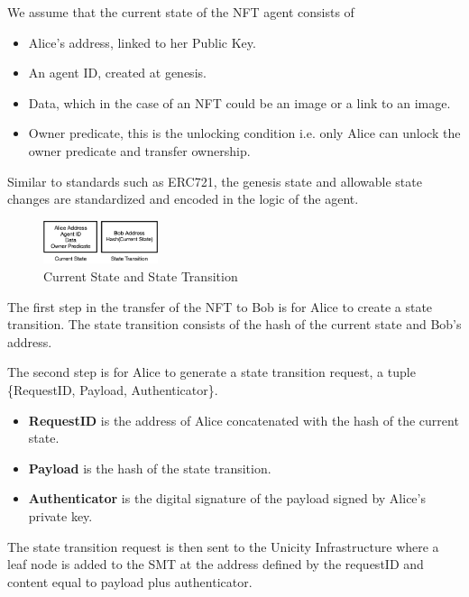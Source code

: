 \documentclass{article}
\begin{document}
We assume that the current state of the NFT agent consists of 

\begin{itemize}
\setlength{\leftmargin}{1em}
 \item  Alice's address, linked to her Public Key.
 \item  An agent ID, created at genesis.
 \item  Data, which in the case of an NFT could be an image or a link to an image.
 \item  Owner  predicate, this is the unlocking condition i.e. only Alice can unlock the owner predicate and transfer ownership.
\end{itemize}

 Similar to standards such as ERC721, the genesis state and allowable state changes are standardized and encoded in the logic of the agent. 

\begin{figure}[htbp]
    \centering
    \includegraphics[width=0.3\textwidth]{CurrentStateAndStateTransition.png}
    \caption{Current State and State Transition}
    \label{fig:CurrentState}
\end{figure}

\vspace{2mm}

The first step in the transfer of the NFT to Bob is for Alice to create a state transition. The state transition consists of the hash of the current state and Bob's address. 

\vspace{2mm}
The second step is for Alice to generate a state transition request, a tuple \{RequestID, Payload, Authenticator\}.

\begin{itemize}
\setlength{\leftmargin}{1em}
 \item  \textbf{RequestID} is the address of Alice concatenated with the hash of the current state.
 \item \textbf{Payload} is the hash of the state transition. 
 \item \textbf{Authenticator} is the digital signature of the payload signed by Alice’s private key.
\end{itemize}

The state transition request is then sent to the Unicity Infrastructure where a leaf node is added to the SMT at the address defined by the requestID and content equal to payload plus authenticator. 
\end{document}
